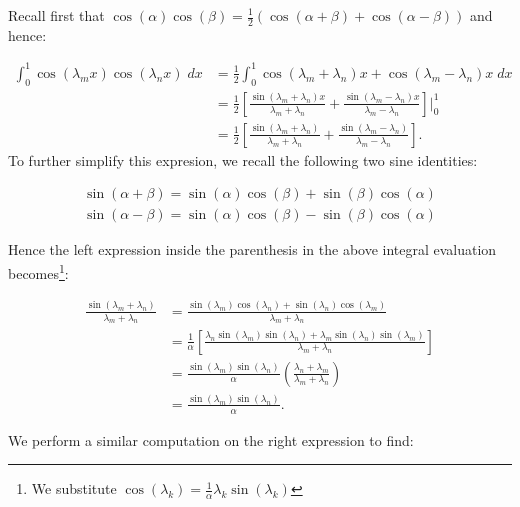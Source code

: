 \begin{solution}
    Recall first that $\cos{(\alpha) \cos{(\beta)}} = \frac{1}{2}\left( \cos(\alpha + \beta) + \cos(\alpha - \beta) \right)$
    and hence:

    \begin{align*}
        \int_{0}^{1}{\cos{(\lambda_m x)}\cos{(\lambda_n x)}\; dx} &= \frac{1}{2} \int_{0}^{1}{\cos{(\lambda_m + \lambda_n) x} + \cos{(\lambda_m - \lambda_n) x}\; dx} \\
                                                                  &= \frac{1}{2} \left[ \frac{\sin{(\lambda_m + \lambda_n)x}}{\lambda_m + \lambda_n} + \frac{\sin{(\lambda_m - \lambda_n)x}}{\lambda_m - \lambda_n} \right] \bigg\vert_{0}^{1} \\
                                                                  &= \frac{1}{2} \left[ \frac{\sin{(\lambda_m + \lambda_n)}}{\lambda_m + \lambda_n} + \frac{\sin{(\lambda_m - \lambda_n)}}{\lambda_m - \lambda_n} \right].
    \end{align*}
    To further simplify this expresion, we recall the following two sine identities:

    \begin{align*}
        \sin{(\alpha + \beta)} = \sin{(\alpha)}\cos{(\beta)} + \sin{(\beta)}\cos{(\alpha)} \\
        \sin{(\alpha - \beta)} = \sin{(\alpha)}\cos{(\beta)} - \sin{(\beta)}\cos{(\alpha)}
    \end{align*}

    Hence the left expression inside the parenthesis in the above integral evaluation becomes\footnote[\dagger]{
        We substitute $\cos{(\lambda_k)} = \frac{1}{\alpha} \lambda_k \sin{(\lambda_k)}$
    }:

    \begin{align*}
        \frac{\sin{(\lambda_m + \lambda_n)}}{\lambda_m + \lambda_n}
        &= \frac{\sin{(\lambda_m)} \cos{(\lambda_n) + \sin{(\lambda_n)}} \cos{(\lambda_m)}}{\lambda_m + \lambda_n} \\
        &= \frac{1}{\alpha} \left[ \frac{\lambda_n \sin{(\lambda_m)} \sin{(\lambda_n) + \lambda_m} \sin{(\lambda_n)} \sin{(\lambda_m)}}{\lambda_m + \lambda_n} \right] \\
        &= \frac{\sin{(\lambda_m)} \sin{(\lambda_n)}}{\alpha} \left( \frac{\lambda_n + \lambda_m}{\lambda_m + \lambda_n} \right) \\
        &= \frac{\sin{(\lambda_m)} \sin{(\lambda_n)}}{\alpha}.
    \end{align*}
    
    We perform a similar computation on the right expression to find:


\end{solution}
